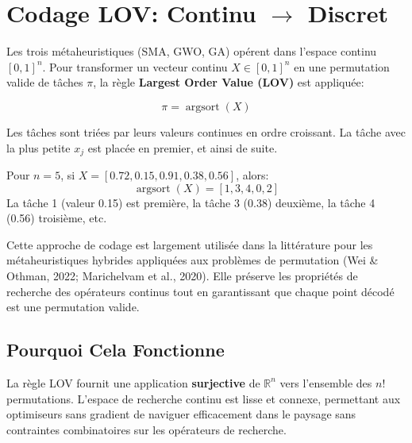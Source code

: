 \documentclass[12pt,a4paper,oneside]{report}
\begin{document}
\section{Codage LOV: Continu $\to$ Discret}

Les trois m\'etaheuristiques (SMA, GWO, GA) op\'erent dans l'espace continu $[0, 1]^n$. Pour transformer un vecteur continu $X \in [0, 1]^n$ en une permutation valide de t\^aches $\pi$, la r\`egle \textbf{Largest Order Value (LOV)} est appliqu\'ee:

\begin{equation}\label{eq:lov}
\pi = \operatorname{argsort}(X)
\end{equation}

Les t\^aches sont tri\'ees par leurs valeurs continues en ordre croissant. La t\^ache avec la plus petite $x_j$ est plac\'ee en premier, et ainsi de suite.

\begin{example}
Pour $n = 5$, si $X = [0.72, 0.15, 0.91, 0.38, 0.56]$, alors:
\[
\operatorname{argsort}(X) = [1, 3, 4, 0, 2]
\]
La t\^ache 1 (valeur 0.15) est premi\`ere, la t\^ache 3 (0.38) deuxi\`eme, la t\^ache 4 (0.56) troisi\`eme, etc.
\end{example}

Cette approche de codage est largement utilis\'ee dans la litt\'erature pour les m\'etaheuristiques hybrides appliqu\'ees aux probl\`emes de permutation (Wei \& Othman, 2022; Marichelvam et al., 2020). Elle pr\'eserve les propri\'et\'es de recherche des op\'erateurs continus tout en garantissant que chaque point d\'ecod\'e est une permutation valide.

\subsection{Pourquoi Cela Fonctionne}

La r\`egle LOV fournit une application \textbf{surjective} de $\mathbb{R}^n$ vers l'ensemble des $n!$ permutations. L'espace de recherche continu est lisse et connexe, permettant aux optimiseurs sans gradient de naviguer efficacement dans le paysage sans contraintes combinatoires sur les op\'erateurs de recherche.

\clearpage

\end{document}
